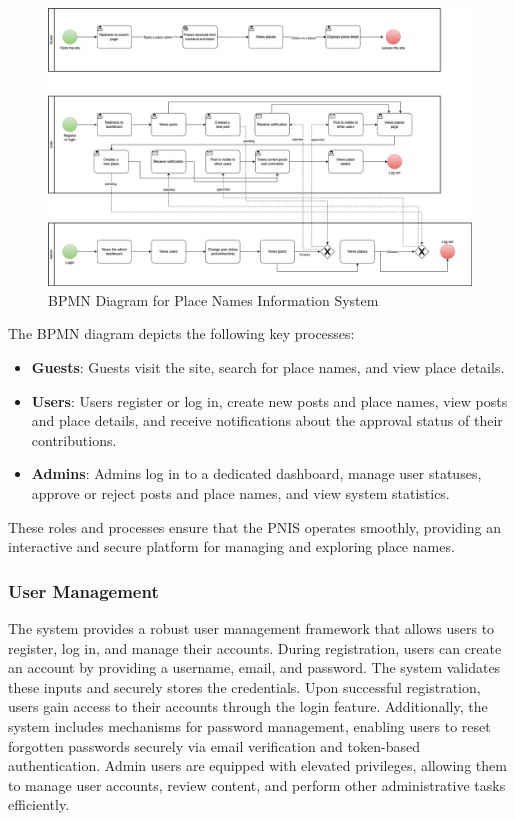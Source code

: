 \begin{figure}[htb]
    \centering
    \includegraphics[width=1.0\textwidth, keepaspectratio]{bpmn.png}
    \caption{BPMN Diagram for Place Names Information System}
    \label{fig:bpmn}
\end{figure}

The BPMN diagram depicts the following key processes:
\begin{itemize}
    \item \textbf{Guests}: Guests visit the site, search for place names, and view place details.
    \item \textbf{Users}: Users register or log in, create new posts and place names, view posts and place details, and receive notifications about the approval status of their contributions.
    \item \textbf{Admins}: Admins log in to a dedicated dashboard, manage user statuses, approve or reject posts and place names, and view system statistics.
\end{itemize}

These roles and processes ensure that the PNIS operates smoothly, providing an interactive and secure platform for managing and exploring place names.
\subsubsection{User Management}
The system provides a robust user management framework that allows users to register, log in, and manage their accounts. During registration, users can create an account by providing a username, email, and password. The system validates these inputs and securely stores the credentials. Upon successful registration, users gain access to their accounts through the login feature. Additionally, the system includes mechanisms for password management, enabling users to reset forgotten passwords securely via email verification and token-based authentication. Admin users are equipped with elevated privileges, allowing them to manage user accounts, review content, and perform other administrative tasks efficiently.

